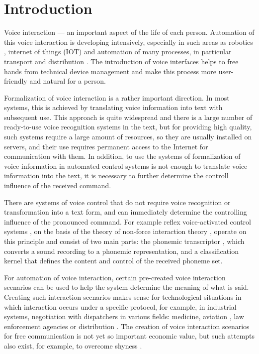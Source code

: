 \section{Introduction}

Voice interaction --- an important aspect of the life of each person. Automation of this voice interaction is developing intensively, especially in such areas as robotics \cite{Ishiguro_2016}, internet of things (IOT) and automation of many processes, in particular transport \cite{eng_Kravchenko_2009,Heisterkamp_2001} and distribution \cite{eng_art2,conf9}. The introduction of voice interfaces helps to free hands from technical device management and make this process more user-friendly and natural for a person.

Formalization of voice interaction is a rather important direction. In most systems, this is achieved by translating voice information into text with subsequent use. This approach is quite widespread and there is a large number of ready-to-use voice recognition systems in the text, but for providing high quality, such systems require a large amount of resources, so they are usually installed on servers, and their use requires permanent access to the Internet for communication with them. In addition, to use the systems of formalization of voice information in automated control systems is not enough to translate voice information into the text, it is necessary to further determine the controll influence of the received command.

There are systems of voice control that do not require voice recognition or transformation into a text form, and can immediately determine the controlling influence of the pronounced command. For example reflex voice-activated control systems \cite{eng_Egorchenkov_2016,Teslia_2014,eng_Teslia_2013}, on the basis of the theory of non-force interaction theory \cite{eng_Teslia_2010}, operate on this principle and consist of two main parts: the phonemic transcriptor \cite{eng_Pylypenko_2008}, which converts a sound recording to a phonemic representation, and a classification kernel that defines the content and control of the received phoneme set.

For automation of voice interaction, certain pre-created voice interaction scenarios \cite{eng_art3} can be used to help the system determine the meaning of what is said. Creating such interaction scenarios makes sense for technological situations in which interaction occurs under a specific protocol, for example, in industrial systems, negotiation with dispatchers in various fields: medicine, aviation \cite{eng_Korsun_2013}, law enforcement agencies or distribution \cite{eng_art3}. The creation of voice interaction scenarios for free communication is not yet so important economic value, but such attempts also exist, for example, to overcome shyness \cite{Ishiguro_2016}.


